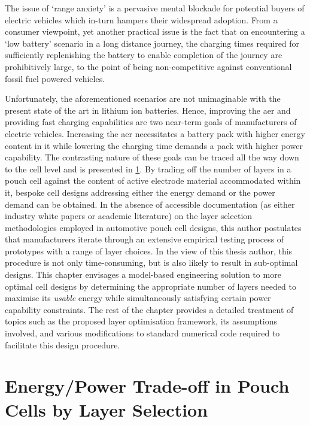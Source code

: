 The issue of `range anxiety' is a pervasive mental blockade for potential buyers
of electric  vehicles which  in-turn hampers their  widespread adoption.  From a
consumer viewpoint, yet another practical issue is the fact that on encountering
a  `low  battery' scenario  in  a  long  distance  journey, the  charging  times
required for sufficiently  replenishing the battery to enable  completion of the
journey are prohibitively  large, to the point of  being non-competitive against
conventional fossil fuel powered vehicles.

Unfortunately,  the  aforementioned  scenarios  are not  unimaginable  with  the
present  state  of the  art  in  lithium  ion  batteries. Hence,  improving  the
\gls{aer} and  providing fast charging  capabilities are two near-term  goals of
manufacturers  of electric  vehicles.  Increasing the  \gls{aer} necessitates  a
battery pack with  higher energy content in it while  lowering the charging time
demands a  pack with higher  power capability.  The contrasting nature  of these
goals can  be traced  all the way  down to  the cell level  and is  presented in
\cref{sec:energypowertradeoff}. By trading  off the number of layers  in a pouch
cell  against  the content  of  active  electrode material  accommodated  within
it,  bespoke cell  designs  addressing either  the energy  demand  or the  power
demand  can  be  obtained.  In  the  absence  of  accessible  documentation  (as
either  industry white  papers or  academic literature)  on the  layer selection
methodologies employed in automotive pouch  cell designs, this author postulates
that manufacturers  iterate through  an extensive  empirical testing  process of
prototypes with  a range of  layer choices. In the  view of this  thesis author,
this  procedure is  not only  time-consuming, but  is also  likely to  result in
sub-optimal designs.  This chapter envisages a  model-based engineering solution
to more  optimal cell designs  by determining  the appropriate number  of layers
needed  to maximise  its  \emph{usable} energy  while simultaneously  satisfying
certain  power  capability constraints.  The  rest  of  the chapter  provides  a
detailed treatment of topics such  as the proposed layer optimisation framework,
its assumptions involved,  and various modifications to  standard numerical code
required to facilitate this design procedure.

\section{Energy/Power Trade-off in Pouch Cells by Layer Selection}\label{sec:energypowertradeoff}

